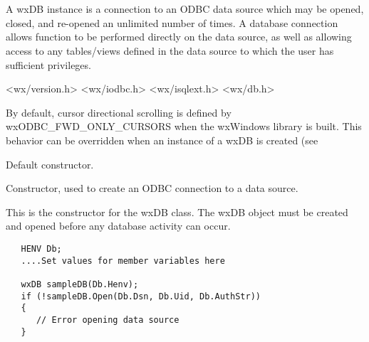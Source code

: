 \section{}\label{wxdb}

A wxDB instance is a connection to an ODBC data source which may
be opened, closed, and re-opened an unlimited number of times.  A
database connection allows function to be performed directly on the
data source, as well as allowing access to any tables/views defined in
the data source to which the user has sufficient privileges.


<wx/version.h>
<wx/iodbc.h>
<wx/isqlext.h>
<wx/db.h>


By default, cursor directional scrolling is defined by wxODBC_FWD_ONLY_CURSORS
when the wxWindows library is built.  This behavior can be overridden when 
an instance of a wxDB is created (see 




\label{wxdbconstr}


Default constructor.


Constructor, used to create an ODBC connection to a data source.




This is the constructor for the wxDB class.  The wxDB object must
be created and opened before any database activity can occur.

\begin{verbatim}
   HENV Db;
   ....Set values for member variables here

   wxDB sampleDB(Db.Henv);
   if (!sampleDB.Open(Db.Dsn, Db.Uid, Db.AuthStr))
   {
      // Error opening data source
   }
\end{verbatim}




